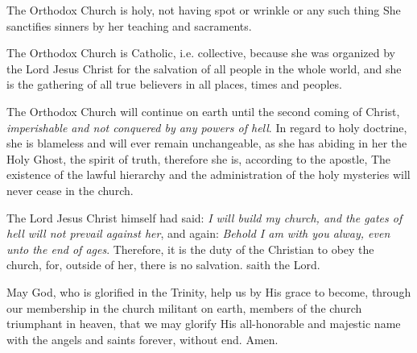 The Orthodox Church is holy, not having
spot or wrinkle or any such thing  She sanctifies sinners by her teaching 
and sacraments. 

The Orthodox Church is Catholic, i.e. collective,
because she was organized by the Lord 
Jesus Christ for the salvation of all people in 
the whole world, and she is the gathering of all 
true believers in all places, times and peoples. 

The Orthodox Church will continue on earth 
until the second coming of Christ, \textit{imperishable 
and not conquered by any powers of hell}. In 
regard to holy doctrine, she is blameless and 
will ever remain unchangeable, as she has 
abiding in her the Holy Ghost, the spirit of truth, 
therefore she is, according to the apostle,  
The existence of the lawful hierarchy and the 
administration of the holy mysteries will never 
cease in the church. 

The Lord Jesus Christ himself had said: \textit{I 
will build my church, and the gates of hell will 
not prevail against her}, and again: \textit{Behold I 
am with you alway, even unto the end of ages}. 
Therefore, it is the duty of the Christian to 
obey the church, for, outside of her, there is no 
salvation.  saith the 
Lord. 

May God, who is glorified in the Trinity, 
help us by His grace to become, through our 
membership in the church militant on earth, 
members of the church triumphant in heaven, 
that we may glorify His all-honorable and 
majestic name with the angels and saints forever,
without end. Amen.

